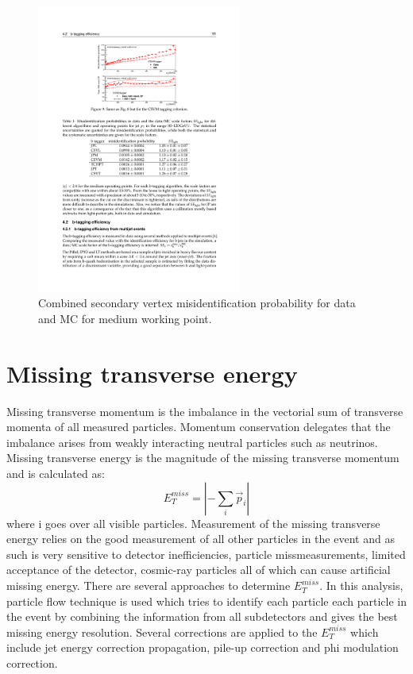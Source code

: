 \begin{figure}[ht]
\centering
	\includegraphics[width=0.6\textwidth]{Figures/MisID_CSVM.pdf}
	\caption{Combined secondary vertex misidentification probability for data and MC for medium working point.\cite{CMS:2013vea}}
	\label{fig:misID}
\end{figure}




\section{Missing transverse energy}

Missing transverse momentum is the imbalance in the vectorial sum of transverse momenta of all measured particles. Momentum conservation delegates that the imbalance arises from weakly interacting neutral particles such as neutrinos. Missing transverse energy is the magnitude of the missing transverse momentum and is calculated as:
\begin{equation}
E_T^{miss}= |-\sum_{i} \vec{p}_i|
\end{equation}
where i goes over all visible particles. Measurement of the missing transverse energy relies on the good measurement of all other particles in the event and as such is very sensitive to detector inefficiencies, particle missmeasurements, limited acceptance of the detector, cosmic-ray particles all of which can cause artificial missing energy. There are several approaches to determine $E_T^{miss}$. In this analysis, particle flow technique is used which tries to identify each particle each particle in the event by combining the information from all subdetectors and gives the best missing energy resolution.\cite{CMS-PAS-PFT-09-001,Chatrchyan:2011tn} Several corrections are applied to the $E_T^{miss}$ which include jet energy correction propagation, pile-up correction and phi modulation correction. 

